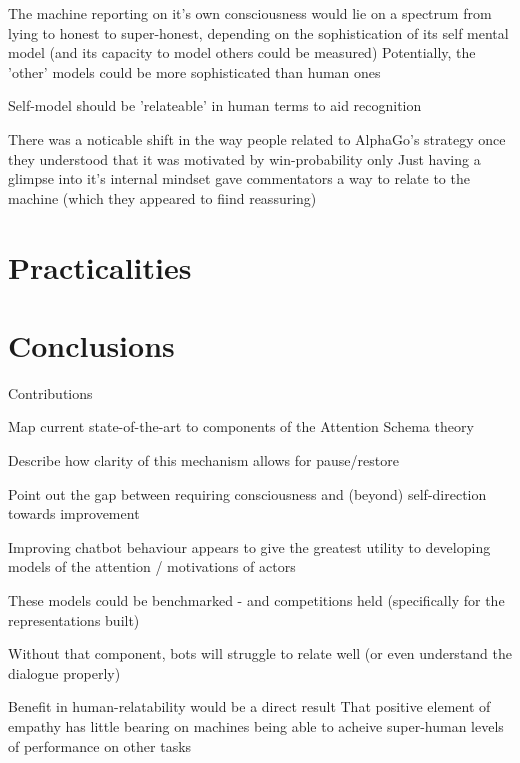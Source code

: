 \documentclass[citeauthoryear]{llncs}
\begin{document}
The machine reporting on it's own consciousness would lie on a spectrum from lying to honest to super-honest, 
  depending on the sophistication of its self mental model (and its capacity to model others could be measured)
  Potentially, the 'other' models could be more sophisticated than human ones
  
Self-model should be 'relateable' in human terms to aid recognition 
  
  There was a noticable shift in the way people related to AlphaGo's strategy once they understood that it was motivated by win-probability only
    Just having a glimpse into it's internal mindset gave commentators a way to relate to the machine (which they appeared to fiind reassuring)
    


\section{Practicalities}


\section{Conclusions}

Contributions

	Map current state-of-the-art to components of the Attention Schema theory

	Describe how clarity of this mechanism allows for pause/restore

	Point out the gap between requiring consciousness and (beyond) self-direction towards improvement




Improving chatbot behaviour appears to give the greatest utility to developing models of the attention / motivations of actors

  These models could be benchmarked - and competitions held (specifically for the representations built)
  
  Without that component, bots will struggle to relate well (or even understand the dialogue properly)
  
  Benefit in human-relatability would be a direct result
    That positive element of empathy has little bearing on machines being able to acheive super-human levels of performance on other tasks
\end{document}
